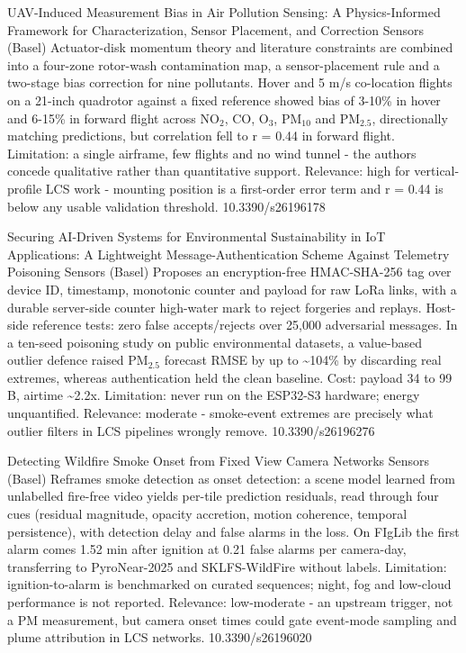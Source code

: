 \documentclass[10pt]{article}
\begin{document}
{UAV-Induced Measurement Bias in Air Pollution Sensing: A Physics-Informed Framework for Characterization, Sensor Placement, and Correction}
{Sensors (Basel)}
{Actuator-disk momentum theory and literature constraints are combined into a four-zone rotor-wash contamination map, a sensor-placement rule and a two-stage bias correction for nine pollutants. Hover and 5 m/s co-location flights on a 21-inch quadrotor against a fixed reference showed bias of 3-10\% in hover and 6-15\% in forward flight across NO$_2$, CO, O$_3$, PM$_{10}$ and PM$_{2.5}$, directionally matching predictions, but correlation fell to r = 0.44 in forward flight. Limitation: a single airframe, few flights and no wind tunnel - the authors concede qualitative rather than quantitative support. Relevance: high for vertical-profile LCS work - mounting position is a first-order error term and r = 0.44 is below any usable validation threshold.}
{10.3390/s26196178}

{Securing AI-Driven Systems for Environmental Sustainability in IoT Applications: A Lightweight Message-Authentication Scheme Against Telemetry Poisoning}
{Sensors (Basel)}
{Proposes an encryption-free HMAC-SHA-256 tag over device ID, timestamp, monotonic counter and payload for raw LoRa links, with a durable server-side counter high-water mark to reject forgeries and replays. Host-side reference tests: zero false accepts/rejects over 25,000 adversarial messages. In a ten-seed poisoning study on public environmental datasets, a value-based outlier defence raised PM$_{2.5}$ forecast RMSE by up to \textasciitilde{}104\% by discarding real extremes, whereas authentication held the clean baseline. Cost: payload 34 to 99 B, airtime \textasciitilde{}2.2x. Limitation: never run on the ESP32-S3 hardware; energy unquantified. Relevance: moderate - smoke-event extremes are precisely what outlier filters in LCS pipelines wrongly remove.}
{10.3390/s26196276}

{Detecting Wildfire Smoke Onset from Fixed View Camera Networks}
{Sensors (Basel)}
{Reframes smoke detection as onset detection: a scene model learned from unlabelled fire-free video yields per-tile prediction residuals, read through four cues (residual magnitude, opacity accretion, motion coherence, temporal persistence), with detection delay and false alarms in the loss. On FIgLib the first alarm comes 1.52 min after ignition at 0.21 false alarms per camera-day, transferring to PyroNear-2025 and SKLFS-WildFire without labels. Limitation: ignition-to-alarm is benchmarked on curated sequences; night, fog and low-cloud performance is not reported. Relevance: low-moderate - an upstream trigger, not a PM measurement, but camera onset times could gate event-mode sampling and plume attribution in LCS networks.}
{10.3390/s26196020}
\end{document}

